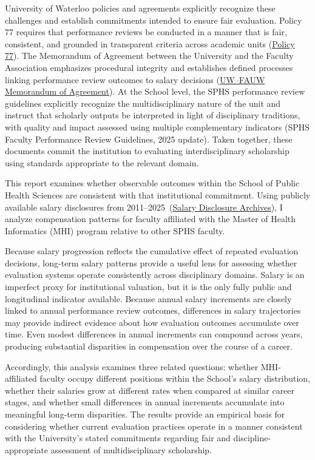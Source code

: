\documentclass{article}
\newcommand{\DataMinYear}{2011}
\newcommand{\DataMaxYear}{2025}
\begin{document}
University of Waterloo policies and agreements explicitly recognize these challenges and establish commitments intended to ensure fair evaluation. Policy 77 requires that performance reviews be conducted in a manner that is fair, consistent, and grounded in transparent criteria across academic units (\href{https://uwaterloo.ca/secretariat/policies-procedures-guidelines/policy-77}{Policy 77}). The Memorandum of Agreement between the University and the Faculty Association emphasizes procedural integrity and establishes defined processes linking performance review outcomes to salary decisions (\href{https://uwaterloo.ca/secretariat/memorandum-agreement-uw-fauw}{UW–FAUW Memorandum of Agreement}). At the School level, the SPHS performance review guidelines explicitly recognize the multidisciplinary nature of the unit and instruct that scholarly outputs be interpreted in light of disciplinary traditions, with quality and impact assessed using multiple complementary indicators (SPHS Faculty Performance Review Guidelines, 2025 update). Taken together, these documents commit the institution to evaluating interdisciplinary scholarship using standards appropriate to the relevant domain.

This report examines whether observable outcomes within the School of Public Health Sciences are consistent with that institutional commitment. Using publicly available salary disclosures from \DataMinYear--\DataMaxYear\ (\href{https://uwaterloo.ca/about/accountability/salary-disclosure}{Salary Disclosure Archives}), I analyze compensation patterns for faculty affiliated with the Master of Health Informatics (MHI) program relative to other SPHS faculty.

Because salary progression reflects the cumulative effect of repeated evaluation decisions, long-term salary patterns provide a useful lens for assessing whether evaluation systems operate consistently across disciplinary domains. Salary is an imperfect proxy for institutional valuation, but it is the only fully public and longitudinal indicator available. Because annual salary increments are closely linked to annual performance review outcomes, differences in salary trajectories may provide indirect evidence about how evaluation outcomes accumulate over time. Even modest differences in annual increments can compound across years, producing substantial disparities in compensation over the course of a career.

Accordingly, this analysis examines three related questions: whether MHI-affiliated faculty occupy different positions within the School’s salary distribution, whether their salaries grow at different rates when compared at similar career stages, and whether small differences in annual increments accumulate into meaningful long-term disparities. The results provide an empirical basis for considering whether current evaluation practices operate in a manner consistent with the University’s stated commitments regarding fair and discipline-appropriate assessment of multidisciplinary scholarship.
\end{document}
